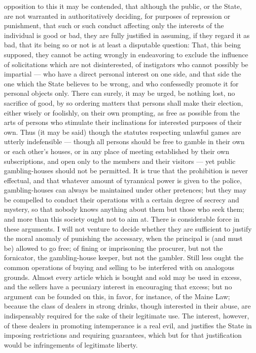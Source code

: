\documentclass[12pt]{report}
\begin{document}
opposition to this it may be contended, that although the public, or the State, are not warranted in authoritatively deciding, for purposes of repression or punishment, that such or such conduct affecting only the interests of the individual is good or bad, they are fully justified in assuming, if they regard it as bad, that its being so or not is at least a disputable question: That, this being supposed, they cannot be acting wrongly in endeavoring to exclude the influence of solicitations which are not disinterested, of instigators who cannot possibly be impartial — who have a direct personal interest on one side, and that side the one which the State believes to be wrong, and who confessedly promote it for personal objects only. There can surely, it may be urged, be nothing lost, no sacrifice of good, by so ordering matters that persons shall make their election, either wisely or foolishly, on their own prompting, as free as possible from the arts of persons who stimulate their inclinations for interested purposes of their own. Thus (it may be said) though the statutes respecting unlawful games are utterly indefensible — though all persons should be free to gamble in their own or each other's houses, or in any place of meeting established by their own subscriptions, and open only to the members and their visitors — yet public gambling-houses should not be permitted. It is true that the prohibition is never effectual, and that whatever amount of tyrannical power is given to the police, gambling-houses can always be maintained under other pretences; but they may be compelled to conduct their operations with a certain degree of secrecy and mystery, so that nobody knows anything about them but those who seek them; and more than this society ought not to aim at. There is considerable force in these arguments. I will not venture to decide whether they are sufficient to justify the moral anomaly of punishing the accessary, when the principal is (and must be) allowed to go free; of fining or imprisoning the procurer, but not the fornicator, the gambling-house keeper, but not the gambler. Still less ought the common operations of buying and selling to be interfered with on analogous grounds. Almost every article which is bought and sold may be used in excess, and the sellers have a pecuniary interest in encouraging that excess; but no argument can be founded on this, in favor, for instance, of the Maine Law; because the class of dealers in strong drinks, though interested in their abuse, are indispensably required for the sake of their legitimate use. The interest, however, of these dealers in promoting intemperance is a real evil, and justifies the State in imposing restrictions and requiring guarantees, which but for that justification would be infringements of legitimate liberty.
\end{document}
